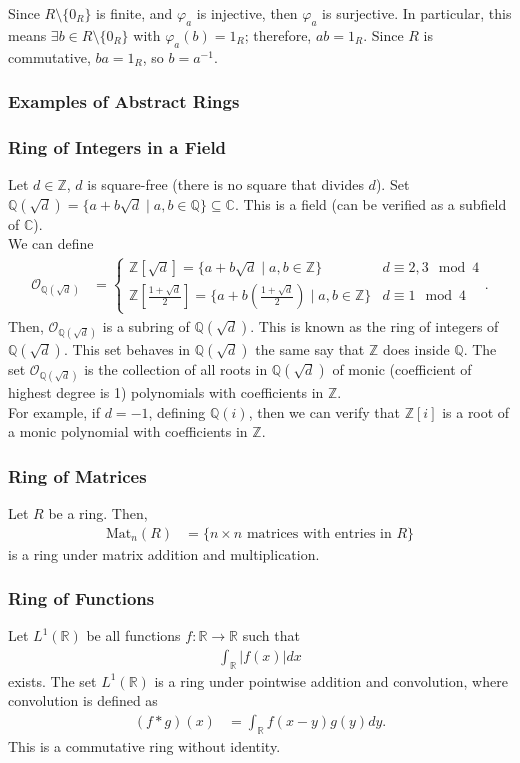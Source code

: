 \documentclass[8pt]{extarticle}
\newcommand{\Q}{\mathbb{Q}}
\newcommand{\Z}{\mathbb{Z}}
\newcommand{\R}{\mathbb{R}}
\newcommand{\C}{\mathbb{C}}
\begin{document}
  Since $R\setminus \{0_R\}$ is finite, and $\varphi_a$ is injective, then $\varphi_a$ is surjective. In particular, this means $\exists b\in R\setminus\{0_R\}$ with $\varphi_a(b) = 1_R$; therefore, $ab = 1_R$. Since $R$ is commutative, $ba = 1_R$, so $b = a^{-1}$.
  \subsubsection{Examples of Abstract Rings}%
  
  \subsubsection{Ring of Integers in a Field}%
  Let $d\in \Z$, $d$ is square-free (there is no square that divides $d$). Set $\Q(\sqrt{d}) = \{a + b\sqrt{d}\mid a,b\in\Q\} \subseteq \C$. This is a field (can be verified as a subfield of $\C$).\\

  We can define
  \begin{align*}
    \mathcal{O}_{\Q\left(\sqrt{d}\right)} &= \begin{cases}
      \Z[\sqrt{d}] = \{a + b\sqrt{d}\mid a,b\in\Z\} & d \equiv 2,3\mod 4\\
      \Z\left[\frac{1 + \sqrt{d}}{2}\right] = \{a + b\left(\frac{1+\sqrt{d}}{2}\right)\mid a,b\in\Z\} & d\equiv 1\mod 4
    \end{cases}.
  \end{align*}
  Then, $\mathcal{O}_{\Q(\sqrt{d})}$ is a subring of $\Q(\sqrt{d})$. This is known as the ring of integers of $\Q(\sqrt{d})$. This set behaves in $\Q(\sqrt{d})$ the same say that $\Z$ does inside $\Q$. The set $\mathcal{O}_{\Q(\sqrt{d})}$ is the collection of all roots in $\Q(\sqrt{d})$ of monic (coefficient of highest degree is 1) polynomials with coefficients in $\Z$.\\

  For example, if $d = -1$, defining $\Q(i)$, then we can verify that $\Z[i]$ is a root of a monic polynomial with coefficients in $\Z$.
  \subsubsection{Ring of Matrices}%
  Let $R$ be a ring. Then,
  \begin{align*}
    \text{Mat}_{n}(R) &= \{\text{$n\times n$ matrices with entries in $R$}\}
  \end{align*}
  is a ring under matrix addition and multiplication.
  \subsubsection{Ring of Functions}%
  Let $L^{1}(\R)$ be all functions $f: \R\rightarrow\R$ such that
  \begin{align*}
    \int_{\R}|f(x)|dx
  \end{align*}
  exists. The set $L^{1}(\R)$ is a ring under pointwise addition and convolution, where convolution is defined as
  \begin{align*}
    \left(f\ast g\right)(x) &= \int_{\R}f(x-y)g(y)dy.
  \end{align*}
  This is a commutative ring without identity.
\end{document}
